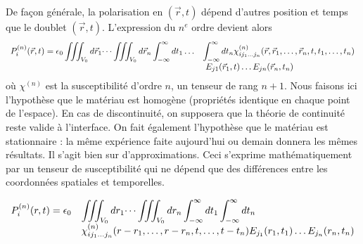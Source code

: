 	De façon générale, la polarisation en $(\vec{r},t)$ dépend d'autres position et temps
	que le doublet $(\vec{r},t)$. L'expression du $n^e$ ordre devient alors
	\begin{equation}
	\begin{array}{ll}
	\DS P_i^{(n)}(\vec{r},t) = \epsilon_0\iiint_{V_0}d\vec{r}_1\dots\iiint_{V_0}d\vec{r}_n
	\int_{-\infty}^\infty dt_1\dots&\DS \int_{-\infty}^\infty dt_n \chi_{ij_{1}\dots j_n}^{(n)}
	(\vec r, \vec r_1,\dots, \vec{r}_n, t, t_1,\dots,t_n)\\ &\DS\ E_{j1}(\vec{r}_1,t)\dots 
	E_{jn}(\vec{r}_n,t_n)
	\end{array}
	\end{equation}
	où $\chi^{(n)}$ est la susceptibilité d'ordre $n$, un tenseur de rang $n+1$. Nous faisons
	ici l'hypothèse que le matériau est homogène (propriétés identique en chaque point de 
	l'espace). En cas de discontinuité, on supposera que la théorie de continuité reste valide
	à l'interface. On fait également l'hypothèse que le matériau est stationnaire : la même 
	expérience faite aujourd'hui ou demain donnera les mêmes résultats. Il s'agit bien sur 
	d'approximations. Ceci s'exprime mathématiquement par un tenseur de susceptibilité qui ne
	dépend que des différences entre les coordonnées spatiales et temporelles.
	
	\begin{equation}
	\begin{array}{ll}
	\displaystyle P_i^{(n)}(r,t) =\epsilon_0&\displaystyle\iiint_{V_0}dr_1\dots \iiint_{V_0} dr_n \int_{-\infty}^
	\infty dt_1\int_{-\infty}^	\infty dt_n\\
	&\displaystyle \chi_{ij_1\dots j_n}^{(n)}(r-r_1,\dots,r-r_n,t,\dots,t-t_n)E_{j_1}(r_1,t_1)\dots
	E_{j_n}(r_n,t_n)
	\end{array}
	\end{equation}































